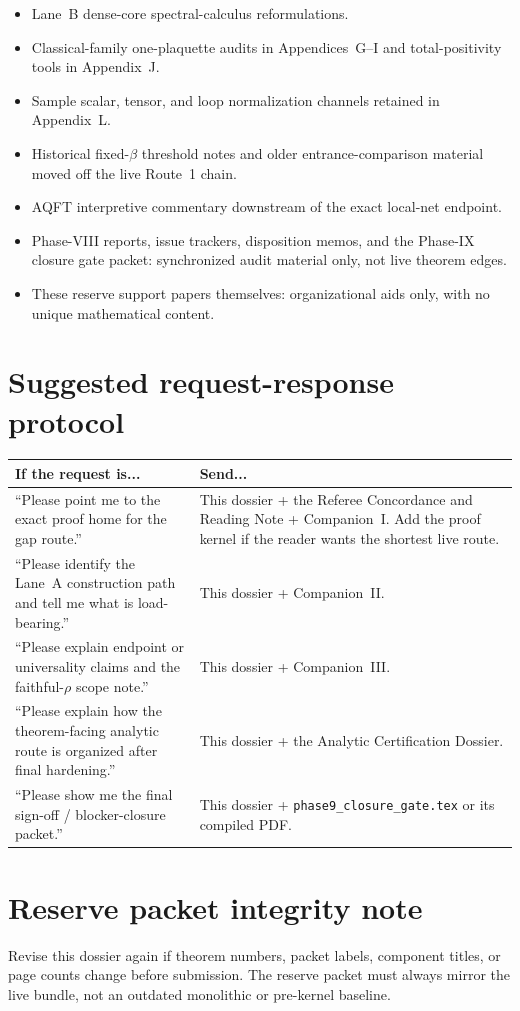 \documentclass[11pt]{article}
\begin{document}
\begin{itemize}
\item Lane~B dense-core spectral-calculus reformulations.
\item Classical-family one-plaquette audits in Appendices~G--I and total-positivity tools in Appendix~J.
\item Sample scalar, tensor, and loop normalization channels retained in Appendix~L.
\item Historical fixed-$\beta$ threshold notes and older entrance-comparison material moved off the live Route~1 chain.
\item AQFT interpretive commentary downstream of the exact local-net endpoint.
\item Phase-VIII reports, issue trackers, disposition memos, and the Phase-IX closure gate packet: synchronized audit material only, not live theorem edges.
\item These reserve support papers themselves: organizational aids only, with no unique mathematical content.
\end{itemize}

\section{Suggested request-response protocol}

\begin{center}
\small
\begin{tabularx}{\linewidth}{@{}L{6.0cm}Y@{}}
\toprule
\textbf{If the request is...} & \textbf{Send...}\\
\midrule
``Please point me to the exact proof home for the gap route.'' & This dossier + the Referee Concordance and Reading Note + Companion~I. Add the proof kernel if the reader wants the shortest live route.\\
``Please identify the Lane~A construction path and tell me what is load-bearing.'' & This dossier + Companion~II.\\
``Please explain endpoint or universality claims and the faithful-$\rho$ scope note.'' & This dossier + Companion~III.\\
``Please explain how the theorem-facing analytic route is organized after final hardening.'' & This dossier + the Analytic Certification Dossier.\\
``Please show me the final sign-off / blocker-closure packet.'' & This dossier + \texttt{phase9\_closure\_gate.tex} or its compiled PDF.\\
\bottomrule
\end{tabularx}
\end{center}

\section{Reserve packet integrity note}

Revise this dossier again if theorem numbers, packet labels, component titles, or page counts change before submission. The reserve packet must always mirror the live bundle, not an outdated monolithic or pre-kernel baseline.
\end{document}
